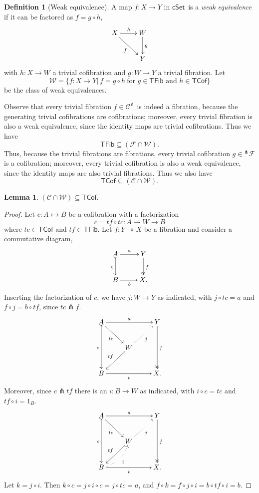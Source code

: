 \documentclass[12pt]{article}
\newcommand{\cSet}{\ensuremath{\mathsf{cSet}}}
\newcommand{\mono}{\ensuremath{\rightarrowtail}}
\newcommand{\ra}{\ensuremath{\rightarrow}}
\newcommand{\onto}{\ensuremath{\twoheadrightarrow}}
\newtheorem{lemma}[theorem]{Lemma}
\theoremstyle{remark}
\theoremstyle{definition}
\newtheorem{definition}[theorem]{Definition}
\begin{document}
\begin{definition}[Weak equivalence]
A map $f: X\ra Y$ in \cSet\ is a \emph{weak equivalence} if it can be factored as $f  = g\circ h$,
\begin{equation*}%
\xymatrix{
X \ar[rd]_{f} \ar[r]^h & W\ar[d]^g\\
& Y
}
\end{equation*}
with $h: X\ra W$ a trivial cofibration and $g: W\ra Y$ a trivial fibration. Let 
\[
\mathcal{W} = \{f: X\ra Y |\ f = g\circ h\ \text{for $g\in\mathsf{TFib}$ and $h\in\mathsf{TCof}$} \}
\]
 be the class of weak equivalences.
\end{definition}

Observe that every trivial fibration $f\in\mathcal{C}^\pitchfork$ is indeed a fibration, because the generating trivial cofibrations are cofibrations; moreover, every trivial fibration is also a weak equivalence, since the identity maps are trivial cofibrations.  Thus we have
\[
\mathsf{TFib} \subseteq (\mathcal{F} \cap \mathcal{W}).
\]
Thus, because the trivial fibrations are fibrations, every trivial cofibration $g\in{^{\pitchfork}\mathcal{F}}$ is a cofibration; moreover, every trivial cofibration is also a weak equivalence, since the identity maps are also trivial fibrations.  Thus we also have
\[
\mathsf{TCof} \subseteq (\mathcal{C} \cap \mathcal{W}).
\]

\begin{lemma}
$(\mathcal{C} \cap \mathcal{W})  \subseteq \mathsf{TCof}.$
\end{lemma}
\begin{proof}
Let $c : A\mono B$ be a cofibration with a factorization $$c = tf\circ tc : A \ra W\ra B$$ where $tc\in\mathsf{TCof}$ and $tf\in\mathsf{TFib}$.  Let $f:Y\onto X$ be a fibration and consider a commutative diagram,
\begin{equation*}%
\xymatrix{
A \ar@{>->}[d]_{c} \ar[r]^-{a}  & Y \ar@{>>}[d]^{f} \\
B \ar[r]_{b} &  X.
}
\end{equation*}
Inserting the factorization of $c$, we have $j : W\ra Y$ as indicated, with $j\circ tc = a$ and $f\circ j = b\circ tf$, since $tc \pitchfork f$.
\begin{equation*}%
\xymatrix{
A \ar@{>->}[dd]_{c} \ar[rd]_{tc} \ar[rr]^-{a}  && Y \ar@{>>}[dd]^{f} \\
& W \ar[ld]_{tf} \ar@{.>}[ru]_{j} & \\
B \ar[rr]_{b} &&  X.
}
\end{equation*}
Moreover, since $c\pitchfork tf$ there is an $i : B \ra W$ as indicated, with $i\circ c = tc$ and $tf\circ i = 1_B$.
\begin{equation*}%
\xymatrix{
A \ar@{>->}[dd]_{c} \ar[rd]_{tc} \ar[rr]^-{a}  && Y \ar@{>>}[dd]^{f} \\
& W \ar[ld]_{tf} \ar@{.>}[ru]_{j} & \\
B \ar[rr]_{b} \ar@{.>}@/_2ex/[ru]_--{i} &&  X.
}
\end{equation*}
Let $k = j\circ i$. Then $k \circ c = j\circ i \circ c = j \circ tc = a$, and $f \circ k = f\circ j\circ i = b\circ tf\circ i = b$.
\end{proof}
\end{document}
